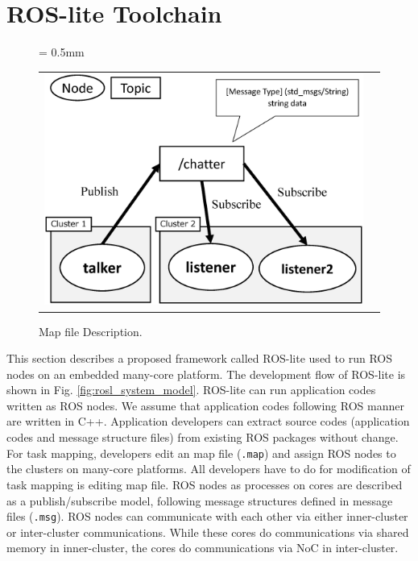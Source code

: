 \section{ROS-lite Toolchain}
\label{sec:toolchain}

\begin{figure}[!htbp]
  \tabcolsep = 0.5mm              %
  \begin{tabular}{cc}
    \begin{minipage}[!htbp]{0.59\textwidth}
      \centering
      \includegraphics[width=0.85\linewidth]{../figure/roslite/example.eps}
      \caption{The publish/subscribe model in ROS-lite.}
      \label{fig:rosl_example}
    \end{minipage}
    &
    \begin{minipage}[!htbp]{0.39\textwidth}
      
      \caption{Map file Description.}
      \label{code:map_file}
    \end{minipage}
  \end{tabular}
\end{figure}

This section describes a proposed framework called ROS-lite used to run ROS nodes on an embedded many-core platform.
The development flow of ROS-lite is shown in Fig. \ref{fig:rosl_system_model}.
ROS-lite can run application codes written as ROS nodes.
We assume that application codes following ROS manner are written in C++.
Application developers can extract source codes (application codes and message structure files) from existing ROS packages without change.
For task mapping, developers edit an map file (\texttt{.map}) and assign ROS nodes to the clusters on many-core platforms.
All developers have to do for modification of task mapping is editing map file.
ROS nodes as processes on cores are described as a publish/subscribe model, following message structures defined in message files (\texttt{.msg}).
ROS nodes can communicate with each other via either inner-cluster or inter-cluster communications.
While these cores do communications via shared memory in inner-cluster, the cores do communications via NoC in inter-cluster.

